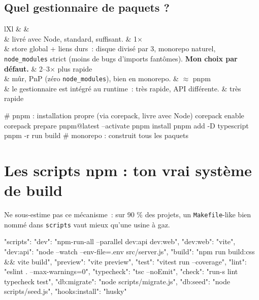 \subsection{Quel gestionnaire de paquets ?}

\begin{tabz}{lXl}
  \headrow {} \&  \&  \\
  \midrule
   \& livr\'e avec Node, standard, suffisant. \& 1$\times$ \\
   \& store global + liens durs~: disque divis\'e par 3, monorepo naturel, \texttt{node\_modules} strict (moins de bugs d'imports fant\^omes). \textbf{Mon choix par d\'efaut.} \& 2--3$\times$ plus rapide \\
   \& m\^ur, PnP (z\'ero \texttt{node\_modules}), bien en monorepo. \& $\approx$ pnpm \\
   \& le gestionnaire est int\'egr\'e au runtime~: tr\`es rapide, API diff\'erente. \& tr\`es rapide \\
\end{tabz}

\begin{terminal}
# pnpm : installation propre (via corepack, livre avec Node)
corepack enable
corepack prepare pnpm@latest --activate
pnpm install
pnpm add -D typescript
pnpm -r run build          # monorepo : construit tous les paquets
\end{terminal}

\section{Les scripts npm : ton vrai syst\`eme de build}

Ne sous-estime pas ce m\'ecanisme~: sur 90 \% des projets, un \verb|Makefile|-like bien nomm\'e
dans \verb|scripts| vaut mieux qu'une usine \`a gaz.

\begin{codejson}
{
  "scripts": {
    "dev": "npm-run-all --parallel dev:api dev:web",
    "dev:web": "vite",
    "dev:api": "node --watch --env-file=.env src/server.js",
    "build": "npm run build:css && vite build",
    "preview": "vite preview",
    "test": "vitest run --coverage",
    "lint": "eslint . --max-warnings=0",
    "typecheck": "tsc --noEmit",
    "check": "run-s lint typecheck test",
    "db:migrate": "node scripts/migrate.js",
    "db:seed": "node scripts/seed.js",
    "hooks:install": "husky"
  }
}
\end{codejson}


